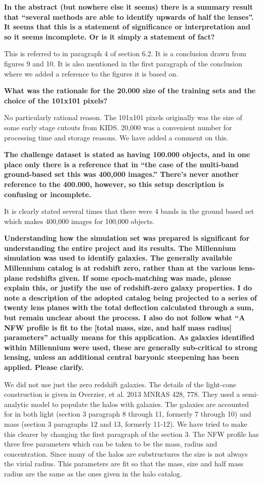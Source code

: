 \documentclass[11pt,a4paper]{article}
\begin{document}
{\bf
In the abstract (but nowhere else it seems) there is a summary result that “several methods are able to identify upwards of half the lenses”.  It seems that this is a statement of significance or interpretation and so it seems incomplete.  Or is it simply a statement of fact? 
}

This is referred to in paragraph 4 of section 6.2.  It is a conclusion drawn from figures 9 and 10.  It is also mentioned in the first paragraph of the conclusion where we added a reference to the figures it is based on.

{\bf
What was the rationale for the 20.000 size of the training sets and the choice of the 101x101 pixels? 
}

No particularly rational reason.  The 101x101 pixels originally was the size of some early stage cutouts from KIDS.  20,000 was a convenient number for processing time and storage reasons.  We have added a comment on this.

{\bf
The challenge dataset is stated as having 100.000 objects, and in one place only there is a reference that in “the case of the multi-band ground-based set this was 400,000 images.”  There’s never another reference to the 400.000, however, so this setup description is confusing or incomplete. 
}

It is clearly stated several times that there were 4 bands in the ground based set which makes 400,000 images for 100,000 objects.

{\bf
Understanding how the simulation set was prepared is significant for understanding the entire project and its results.  The Millennium simulation was used to identify galaxies.  The generally available Millennium catalog is at redshift zero, rather than at the various lens-plane redshifts given.  If some epoch-matching was made, please explain this, or justify the use of redshift-zero galaxy properties.  I do note a description of the adopted catalog being projected to a series of twenty lens planes with the total deflection calculated through a sum, but remain unclear about the process.  I also do not follow what “A NFW profile is fit to the [total mass, size, and half mass radius] parameters” actually means for this application.  As galaxies identified within Millennium were used, these are generally sub-critical to strong lensing, unless an additional central baryonic steepening has been applied. Please clarify.  
}

We did not use just the zero redshift galaxies.  The details of the light-cone construction is given in Overzier, et al. 2013 MNRAS 428, 778.  They used a semi-analytic model to populate the halos with galaxies.  The galaxies are accounted for in both light (section 3 paragraph 8 through 11, formerly 7 through 10) and mass 
(section 3 paragraphs 12 and 13, formerly 11-12).  We have tried to make this clearer  by changing the first paragraph of the section 3.  The NFW profile has three free parameters which can be taken to be the mass, radius and concentration.  Since many of the halos are substructures the size is not always the virial radius.
This parameters are fit so that the mass, size and half mass radius are the same as the ones given in the halo catalog.
\end{document}
